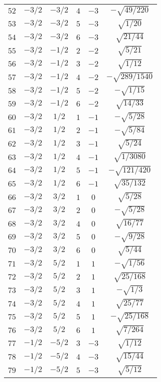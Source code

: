 \begin{table}
\begin{center}
\begin{tabular}{|c|c|c|c|c|c|}
$52$ & $-3/2$ & $-3/2$ & $4$ & $-3$ & $-\sqrt{49/220}$ \\ 
$53$ & $-3/2$ & $-3/2$ & $5$ & $-3$ & $\sqrt{1/20}$ \\ 
$54$ & $-3/2$ & $-3/2$ & $6$ & $-3$ & $\sqrt{21/44}$ \\ 
$55$ & $-3/2$ & $-1/2$ & $2$ & $-2$ & $\sqrt{5/21}$ \\ 
$56$ & $-3/2$ & $-1/2$ & $3$ & $-2$ & $\sqrt{1/12}$ \\ 
$57$ & $-3/2$ & $-1/2$ & $4$ & $-2$ & $-\sqrt{289/1540}$ \\ 
$58$ & $-3/2$ & $-1/2$ & $5$ & $-2$ & $-\sqrt{1/15}$ \\ 
$59$ & $-3/2$ & $-1/2$ & $6$ & $-2$ & $\sqrt{14/33}$ \\ 
$60$ & $-3/2$ & $1/2$ & $1$ & $-1$ & $-\sqrt{5/28}$ \\ 
$61$ & $-3/2$ & $1/2$ & $2$ & $-1$ & $-\sqrt{5/84}$ \\ 
$62$ & $-3/2$ & $1/2$ & $3$ & $-1$ & $\sqrt{5/24}$ \\ 
$63$ & $-3/2$ & $1/2$ & $4$ & $-1$ & $\sqrt{1/3080}$ \\ 
$64$ & $-3/2$ & $1/2$ & $5$ & $-1$ & $-\sqrt{121/420}$ \\ 
$65$ & $-3/2$ & $1/2$ & $6$ & $-1$ & $\sqrt{35/132}$ \\ 
$66$ & $-3/2$ & $3/2$ & $1$ & $0$ & $\sqrt{5/28}$ \\ 
$67$ & $-3/2$ & $3/2$ & $2$ & $0$ & $-\sqrt{5/28}$ \\ 
$68$ & $-3/2$ & $3/2$ & $4$ & $0$ & $\sqrt{16/77}$ \\ 
$69$ & $-3/2$ & $3/2$ & $5$ & $0$ & $-\sqrt{9/28}$ \\ 
$70$ & $-3/2$ & $3/2$ & $6$ & $0$ & $\sqrt{5/44}$ \\ 
$71$ & $-3/2$ & $5/2$ & $1$ & $1$ & $-\sqrt{1/56}$ \\ 
$72$ & $-3/2$ & $5/2$ & $2$ & $1$ & $\sqrt{25/168}$ \\ 
$73$ & $-3/2$ & $5/2$ & $3$ & $1$ & $-\sqrt{1/3}$ \\ 
$74$ & $-3/2$ & $5/2$ & $4$ & $1$ & $\sqrt{25/77}$ \\ 
$75$ & $-3/2$ & $5/2$ & $5$ & $1$ & $-\sqrt{25/168}$ \\ 
$76$ & $-3/2$ & $5/2$ & $6$ & $1$ & $\sqrt{7/264}$ \\ 
$77$ & $-1/2$ & $-5/2$ & $3$ & $-3$ & $\sqrt{1/12}$ \\ 
$78$ & $-1/2$ & $-5/2$ & $4$ & $-3$ & $\sqrt{15/44}$ \\ 
$79$ & $-1/2$ & $-5/2$ & $5$ & $-3$ & $\sqrt{5/12}$ \\ 

\end{tabular}
\end{center}
\end{table}
